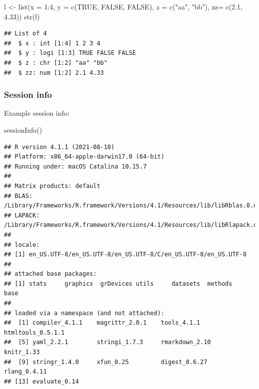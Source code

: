 \documentclass[
  12pt,
]{article}
\newenvironment{Shaded}{\begin{snugshade}}{\end{snugshade}}
\newcommand{\AttributeTok}[1]{\textcolor[rgb]{0.77,0.63,0.00}{#1}}
\newcommand{\ConstantTok}[1]{\textcolor[rgb]{0.00,0.00,0.00}{#1}}
\newcommand{\DecValTok}[1]{\textcolor[rgb]{0.00,0.00,0.81}{#1}}
\newcommand{\FloatTok}[1]{\textcolor[rgb]{0.00,0.00,0.81}{#1}}
\newcommand{\FunctionTok}[1]{\textcolor[rgb]{0.00,0.00,0.00}{#1}}
\newcommand{\NormalTok}[1]{#1}
\newcommand{\OtherTok}[1]{\textcolor[rgb]{0.56,0.35,0.01}{#1}}
\newcommand{\SpecialCharTok}[1]{\textcolor[rgb]{0.00,0.00,0.00}{#1}}
\newcommand{\StringTok}[1]{\textcolor[rgb]{0.31,0.60,0.02}{#1}}
\begin{document}
\begin{Shaded}
\begin{Highlighting}[]
\NormalTok{l }\OtherTok{\textless{}{-}} \FunctionTok{list}\NormalTok{(}\AttributeTok{x =} \DecValTok{1}\SpecialCharTok{:}\DecValTok{4}\NormalTok{, }\AttributeTok{y =} \FunctionTok{c}\NormalTok{(}\ConstantTok{TRUE}\NormalTok{, }\ConstantTok{FALSE}\NormalTok{, }\ConstantTok{FALSE}\NormalTok{), }\AttributeTok{z =} \FunctionTok{c}\NormalTok{(}\StringTok{"aa"}\NormalTok{, }\StringTok{"bb"}\NormalTok{), }\AttributeTok{zz=} \FunctionTok{c}\NormalTok{(}\FloatTok{2.1}\NormalTok{, }\FloatTok{4.33}\NormalTok{))}
\FunctionTok{str}\NormalTok{(l)}
\end{Highlighting}
\end{Shaded}

\begin{verbatim}
## List of 4
##  $ x : int [1:4] 1 2 3 4
##  $ y : logi [1:3] TRUE FALSE FALSE
##  $ z : chr [1:2] "aa" "bb"
##  $ zz: num [1:2] 2.1 4.33
\end{verbatim}

\hypertarget{session-info}{%
\subsubsection{Session info}\label{session-info}}

Example session info:

\begin{Shaded}
\begin{Highlighting}[]
\FunctionTok{sessionInfo}\NormalTok{()}
\end{Highlighting}
\end{Shaded}

\begin{verbatim}
## R version 4.1.1 (2021-08-10)
## Platform: x86_64-apple-darwin17.0 (64-bit)
## Running under: macOS Catalina 10.15.7
## 
## Matrix products: default
## BLAS:   /Library/Frameworks/R.framework/Versions/4.1/Resources/lib/libRblas.0.dylib
## LAPACK: /Library/Frameworks/R.framework/Versions/4.1/Resources/lib/libRlapack.dylib
## 
## locale:
## [1] en_US.UTF-8/en_US.UTF-8/en_US.UTF-8/C/en_US.UTF-8/en_US.UTF-8
## 
## attached base packages:
## [1] stats     graphics  grDevices utils     datasets  methods   base     
## 
## loaded via a namespace (and not attached):
##  [1] compiler_4.1.1    magrittr_2.0.1    tools_4.1.1       htmltools_0.5.1.1
##  [5] yaml_2.2.1        stringi_1.7.3     rmarkdown_2.10    knitr_1.33       
##  [9] stringr_1.4.0     xfun_0.25         digest_0.6.27     rlang_0.4.11     
## [13] evaluate_0.14
\end{verbatim}
\end{document}
